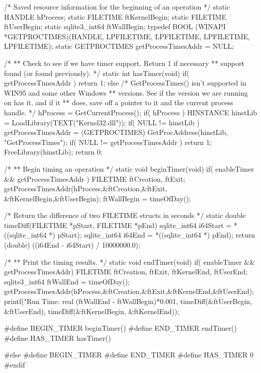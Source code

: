 \begin{Codex}[label=shell.c,numbers=left]
/* Saved resource information for the beginning of an operation */
static HANDLE hProcess;
static FILETIME ftKernelBegin;
static FILETIME ftUserBegin;
static sqlite3_int64 ftWallBegin;
typedef BOOL (WINAPI *GETPROCTIMES)(HANDLE, LPFILETIME, LPFILETIME,
                                    LPFILETIME, LPFILETIME);
static GETPROCTIMES getProcessTimesAddr = NULL;

/*
** Check to see if we have timer support.  Return 1 if necessary
** support found (or found previously).
*/
static int hasTimer(void){
  if( getProcessTimesAddr ){
    return 1;
  } else {
    /* GetProcessTimes() isn't supported in WIN95 and some other Windows
    ** versions. See if the version we are running on has it, and if it
    ** does, save off a pointer to it and the current process handle.
    */
    hProcess = GetCurrentProcess();
    if( hProcess ){
      HINSTANCE hinstLib = LoadLibrary(TEXT("Kernel32.dll"));
      if( NULL != hinstLib ){
        getProcessTimesAddr =
            (GETPROCTIMES) GetProcAddress(hinstLib, "GetProcessTimes");
        if( NULL != getProcessTimesAddr ){
          return 1;
        }
        FreeLibrary(hinstLib); 
      }
    }
  }
  return 0;
}

/*
** Begin timing an operation
*/
static void beginTimer(void){
  if( enableTimer && getProcessTimesAddr ){
    FILETIME ftCreation, ftExit;
    getProcessTimesAddr(hProcess,&ftCreation,&ftExit,
                        &ftKernelBegin,&ftUserBegin);
    ftWallBegin = timeOfDay();
  }
}

/* Return the difference of two FILETIME structs in seconds */
static double timeDiff(FILETIME *pStart, FILETIME *pEnd){
  sqlite_int64 i64Start = *((sqlite_int64 *) pStart);
  sqlite_int64 i64End = *((sqlite_int64 *) pEnd);
  return (double) ((i64End - i64Start) / 10000000.0);
}

/*
** Print the timing results.
*/
static void endTimer(void){
  if( enableTimer && getProcessTimesAddr){
    FILETIME ftCreation, ftExit, ftKernelEnd, ftUserEnd;
    sqlite3_int64 ftWallEnd = timeOfDay();
    getProcessTimesAddr(hProcess,&ftCreation,&ftExit,&ftKernelEnd,&ftUserEnd);
    printf("Run Time: real %
       (ftWallEnd - ftWallBegin)*0.001,
       timeDiff(&ftUserBegin, &ftUserEnd),
       timeDiff(&ftKernelBegin, &ftKernelEnd));
  }
}

#define BEGIN_TIMER beginTimer()
#define END_TIMER endTimer()
#define HAS_TIMER hasTimer()

#else
#define BEGIN_TIMER 
#define END_TIMER
#define HAS_TIMER 0
#endif


\end{Codex}
